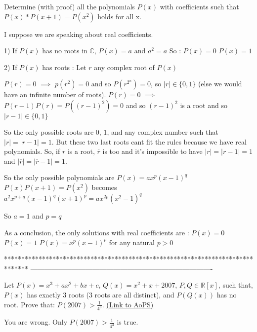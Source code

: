 \begin{solution}
	\begin{tcolorbox}Determine (with proof) all the polynomials $ P(x)$ with coefficients such that $ P(x) * P(x + 1) = P(x^2)$ holds for all x.\end{tcolorbox}

I suppose we are speaking about real coefficients.

1) If $ P(x)$ has no roots in $ \mathbb{C}$, $ P(x)=a$ and $ a^2=a$ So :
$ P(x)=0$
$ P(x)=1$

2) If $ P(x)$ has roots :
Let $ r$ any complex root of $ P(x)$ 

$ P(r)=0$ $ \implies$ $ p(r^2)=0$ and so $ P(r^{2^n})=0$, so $ |r|\in\{0,1\}$ (else we would have an infinite number of roots).
$ P(r)=0$ $ \implies$ $ P(r-1)P(r)=P((r-1)^2)=0$ and so $ (r-1)^2$ is a root and so $ |r-1|\in\{0,1\}$ 

So the only possible roots are $ 0$, $ 1$, and any complex number such that $ |r|=|r-1|=1$. But these two last roots cant fit the rules because we have real polynomials. So, if $ r$ is a root, $ \overline{r}$ is too and it's impossible to have $ |r|=|r-1|=1$ and $ |\overline{r}|=|\overline{r}-1|=1$.

So the only possible polynomials are $ P(x)=ax^p(x-1)^q$
$ P(x)P(x+1)=P(x^2)$ becomes $ a^2x^{p+q}(x-1)^q(x+1)^p=ax^{2p}(x^2-1)^q$

So $ a=1$ and $ p=q$

As a conclusion, the only solutions with real coefficients are :
$ P(x)=0$
$ P(x)=1$
$ P(x)=x^p(x-1)^p$ for any natural $ p>0$
\end{solution}
*******************************************************************************
-------------------------------------------------------------------------------

\begin{problem}
	Let $ P(x) = x^3 + ax^2 + bx + c$, $ Q(x) = x^2 + x + 2007$, $ P,Q\in \mathbb {R}[x]$, such that, $ P(x)$ has exactly $ 3$ roots ($ 3$ roots are all distinct), and $ P(Q(x))$ has no root. Prove that: $ P(2007) > \frac {1}{4^3}$.
	\flushright \href{https://artofproblemsolving.com/community/c6h274252}{(Link to AoPS)}
\end{problem}



\begin{solution}
	You are wrong. Only $ P(2007)>\frac{1}{4^3}$ is true.
\end{solution}



